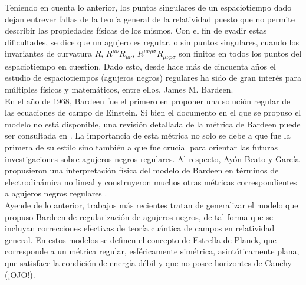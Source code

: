 \documentclass{article}
\numberwithin{equation}{section}
\theoremstyle{definition}
\begin{document}
Teniendo en cuenta lo anterior, los puntos singulares de un espaciotiempo dado dejan entrever fallas de la teoría general de la relatividad puesto que no permite describir las propiedades físicas de los mismos. Con el fin de evadir estas dificultades, se dice que un agujero es regular, o sin puntos singulares, cuando los invariantes de curvatura $R$, $R^{\mu \nu}R_{\mu \nu}$, $R^{\mu \nu \rho \sigma}R_{\mu \nu \rho \sigma}$ son finitos en todos los puntos del espaciotiempo en cuestion. Dado esto, desde hace más de cincuenta años el estudio de espaciotiempos (agujeros negros) regulares ha sido de gran interés para múltiples físicos y matemáticos, entre ellos, James M. Bardeen. \\

En el año de 1968, Bardeen fue el primero en proponer una solución regular de las ecuaciones de campo de Einstein. Si bien el documento \cite{bardeen} en el que se propuso el modelo no está disponible, una revisión detallada de la métrica de Bardeen puede ser consultada en \cite{borde1994}. La importancia de esta métrica no solo se debe a que fue la primera de su estilo sino también a que fue crucial para orientar las futuras investigaciones sobre agujeros negros regulares. Al respecto, Ayón-Beato y García propusieron una interpretación física del modelo de Bardeen en términos de electrodinámica no lineal  \cite{ayon-beato2000} y construyeron muchos otras métricas correspondientes a agujeros negros regulares \cite{ayon-beato2005,ayon-beato1999-1,ayon-beato1999-2,ayon-beato1999-3}.\\

Ayende de lo anterior, trabajos más recientes \cite{hayward2006,lorenzo,rovelli} tratan de generalizar el modelo que propuso Bardeen de regularización de agujeros negros, de tal forma que se incluyan correcciones efectivas de teoría cuántica de campos en relatividad general. En estos modelos se definen el concepto de Estrella de Planck, que corresponde a un métrica regular, esféricamente simétrica, asintóticamente plana, que satisface la condición de energía débil y que no posee horizontes de Cauchy (¡OJO!).\\
\end{document}
